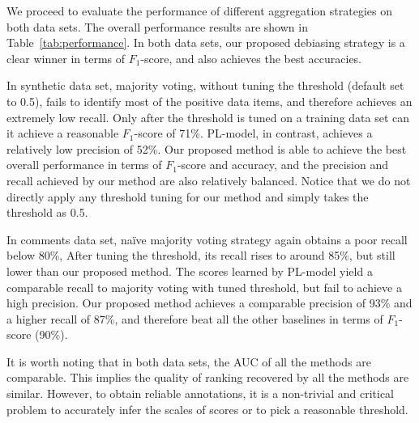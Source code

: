 We proceed to evaluate the performance of different aggregation strategies on both data sets.  
The overall performance results are shown in Table~\ref{tab:performance}.  
In both data sets, our proposed debiasing strategy is a clear winner in terms of $F_1$-score, 
and also achieves the best accuracies.  

In synthetic data set, majority voting, without tuning the threshold (default set to 0.5), fails to identify most of the positive data items, 
and therefore achieves an extremely low recall.  
Only after the threshold is tuned on a training data set 
can it achieve a reasonable $F_1$-score of 71\%.  
PL-model, in contrast, achieves a relatively low precision of 52\%.  
Our proposed method is able to achieve the best overall performance in terms of $F_1$-score and accuracy, 
and the precision and recall achieved by our method are also relatively balanced.  
Notice that we do not directly apply any threshold tuning for our method and simply takes the threshold as 0.5.  

In comments data set, na\"{i}ve majority voting strategy again obtains a poor recall below 80\%, 
After tuning the threshold, its recall rises to around 85\%, but still lower than our proposed method.  
The scores learned by PL-model yield a comparable recall to majority voting with tuned threshold, 
but fail to achieve a high precision.  
Our proposed method achieves a comparable precision of 93\% and a higher recall of 87\%, 
and therefore beat all the other baselines in terms of $F_1$-score (90\%).  


It is worth noting that in both data sets, the AUC of all the methods are comparable.  
This implies the quality of ranking recovered by all the methods are similar.  
However, to obtain reliable annotations, it is a non-trivial and critical problem to accurately infer the scales of scores 
or to pick a reasonable threshold.  




